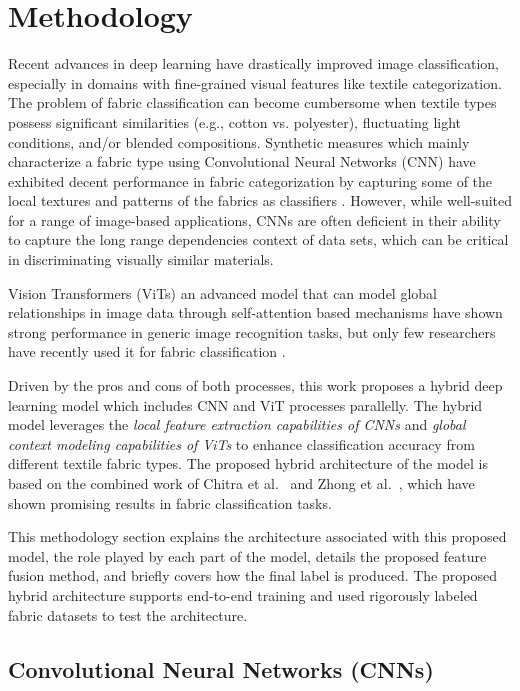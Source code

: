 \section{Methodology}

Recent advances in deep learning have drastically improved image classification, especially in domains with fine-grained visual features like textile categorization. The problem of fabric classification can become cumbersome when textile types possess significant similarities (e.g., cotton vs. polyester), fluctuating light conditions, and/or blended compositions. Synthetic measures which mainly characterize a fabric type using Convolutional Neural Networks (CNN) have exhibited decent performance in fabric categorization by capturing some of the local textures and patterns of the fabrics as classifiers \cite{hong2024research, kampouris2016fine}. However, while well-suited for a range of image-based applications, CNNs are often deficient in their ability to capture the long range dependencies context of data sets, which can be critical in discriminating visually similar materials. 

Vision Transformers (ViTs) an advanced model that can model global relationships in image data through self-attention based mechanisms \cite{dosovitskiy2020vit} have shown strong performance in generic image recognition tasks, but only few researchers have recently used it for fabric classification \cite{chitra2023fabric}. 

Driven by the pros and cons of both processes, this work proposes a hybrid deep learning model which includes CNN and ViT processes parallelly. The hybrid model leverages the \textit{local feature extraction capabilities of CNNs} and \textit{global context modeling capabilities of ViTs} to enhance classification accuracy from different textile fabric types. The proposed hybrid architecture of the model is based on the combined work of Chitra et al.~\cite{chitra2023fabric} and Zhong et al.~\cite{hong2024research}, which have shown promising results in fabric classification tasks.

This methodology section explains the architecture associated with this proposed model, the role played by each part of the model, details the proposed feature fusion method, and briefly covers how the final label is produced. The proposed hybrid architecture supports end-to-end training and used rigorously labeled fabric datasets to test the architecture.

\subsection{Convolutional Neural Networks (CNNs)}

